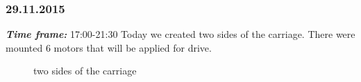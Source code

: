 \subsubsection{29.11.2015}
\textit{\textbf{Time frame:}} 17:00-21:30 \newline
Today we created two sides of the carriage. There were mounted 6 motors that will be applied for drive.

  	\begin{figure}[H]
  		\begin{minipage}[h]{1\linewidth}
  			\caption{two sides of the carriage}
  		\end{minipage}
  	\end{figure}
  	
